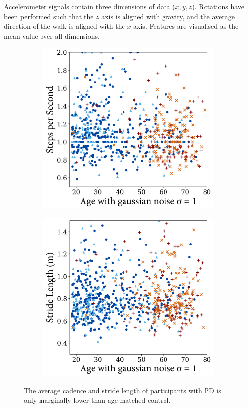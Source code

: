 \documentclass[12pt, twoside]{book}
\begin{document}
Accelerometer signals contain three dimensions of data ($x,y,z$). Rotations have been performed such that the $z$ axis is aligned with gravity, and the average direction of the walk is aligned with the $x$ axis. Features are visualised as the mean value over all dimensions.

\begin{figure}[!htb]
	\centering
	\begin{subfigure}{.5\textwidth}
		\centering
		\includegraphics[width=0.92\linewidth]{stepspermin.png}
	\end{subfigure}%
	\begin{subfigure}{.5\textwidth}
		\centering
		\includegraphics[width=0.92\linewidth]{stridelength.png}
	\end{subfigure}
	\caption{The average cadence and stride length of participants with PD is only marginally lower than age matched control.}
	\label{basicwalkvis}
\end{figure}
\end{document}
